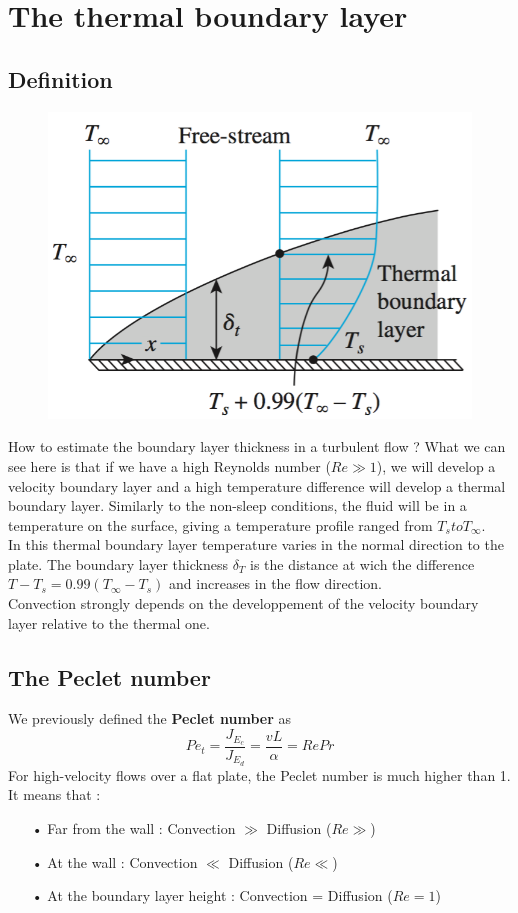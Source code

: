 \section{The thermal boundary layer}
\subsection{Definition}
	\begin{figure}
	\vspace{-5 mm}
	\includegraphics[scale=0.3]{ch5/7}
	\end{figure}			
	How to estimate the boundary layer thickness in a turbulent flow ? What we can see here is that if we have a high Reynolds number ($Re \gg 1$), we will develop a velocity boundary layer and a high temperature difference will develop a thermal boundary layer. Similarly to the non-sleep conditions, the fluid will be in a temperature on the surface, giving a temperature profile ranged from $T_s to T_\infty$. \\
In this thermal boundary layer temperature varies in the normal direction to the plate. The boundary layer thickness $\delta _T$ is the distance at wich the difference $T-T_s = 0.99 (T_\infty -T_s)$ and increases in the flow direction. \\
Convection strongly depends on the developpement of the velocity boundary layer relative to the thermal one. 

\subsection{The Peclet number}
	We previously defined the \textbf{Peclet number} as 
	\begin{equation}
		Pe_t = \frac{J_{E_c}}{J_{E_d}} = \frac{vL}{\alpha} = RePr
	\end{equation}
	For high-velocity flows over a flat plate, the Peclet number is much higher than 1. It means that : 
	\begin{itemize}
		\item[•] Far from the wall : Convection $\gg$ Diffusion ($Re \gg$)
		\item[•] At the wall : Convection $\ll$ Diffusion ($Re \ll$)
		\item[•] At the boundary layer height : Convection = Diffusion ($Re = 1$)
	\end{itemize}
	
